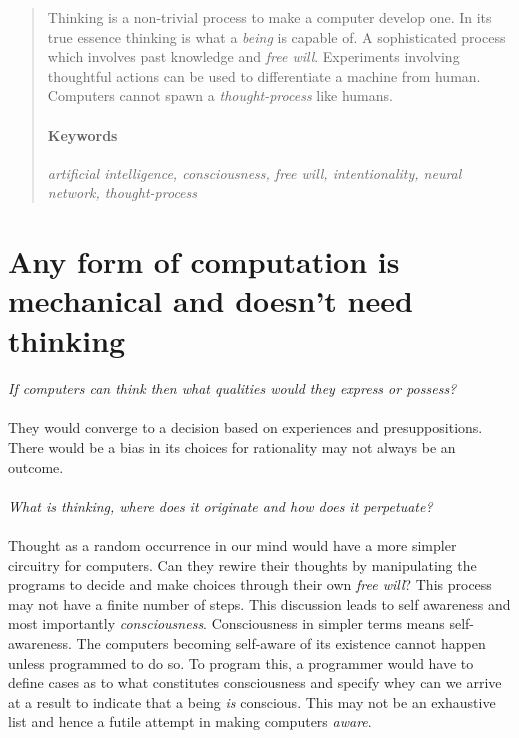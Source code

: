 \documentclass[a4paper]{article}
\begin{document}
	
	\maketitle
	
	\begin{abstract}
	Thinking is a non-trivial process to make a computer develop one. In its true essence thinking is what a \textit{being} is capable of. A sophisticated process which involves past knowledge
	and \textit{free will}. Experiments involving thoughtful actions can be used to differentiate a machine from human. Computers cannot spawn a \textit{thought-process} like humans.
	\paragraph{Keywords} \textit{artificial intelligence, consciousness, free will, intentionality, neural network, thought-process}
	\end{abstract}
	
	\section{Any form of computation is mechanical and doesn't need thinking}
	\paragraph{}
	\textit{If computers can think then what qualities would they express or possess?}
	\paragraph{}They would converge to a decision based on experiences and presuppositions. There would be a bias
	in its choices for rationality may not always be an outcome.
	\paragraph{}
	\textit{What is thinking, where does it originate and how does it perpetuate?}
	\paragraph{}
	Thought as a random occurrence in our mind would have a more simpler circuitry for computers. Can they
	rewire their thoughts by manipulating the programs to decide and make choices through their own \textit{free will}? This process may not have a finite number of steps. This discussion leads to self awareness and most importantly \textit{consciousness}. Consciousness in simpler terms means self-awareness. The computers becoming self-aware of its existence cannot happen unless programmed to do so. To program this, a programmer would have to define cases as to what constitutes consciousness and specify whey can we arrive at a result to indicate that a being \textit{is} conscious. This may not be an exhaustive list and hence a futile attempt in making computers \textit{aware}.
\end{document}
